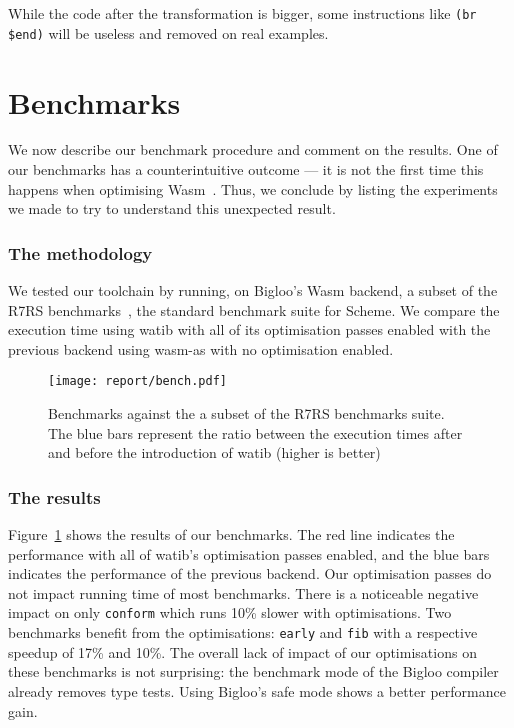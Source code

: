 \documentclass[a4paper,11pt]{article}
\begin{document}
While the code after the transformation is bigger, some instructions like
\texttt{(br \$end)} will be useless and removed on real examples.

\section{Benchmarks}\label{bench}
We now describe our benchmark procedure and comment on the results. One of our
benchmarks has a counterintuitive outcome --- it is not the first time this
happens when optimising Wasm~\cite{romano2023function}. Thus, we conclude by
listing the experiments we made to try to understand this unexpected result.
\subsubsection{The methodology}
We tested our toolchain by running, on Bigloo's Wasm backend, a subset of the
R7RS benchmarks~\cite{r7rsbench}, the standard benchmark suite for Scheme. We
compare the execution time using \textsf{watib} with all of its optimisation
passes enabled with the previous backend using \textsf{wasm-as} with no
optimisation enabled.
\begin{figure}[h!]
  \texttt{[image: report/bench.pdf]}
  \caption{Benchmarks against the a subset of the R7RS benchmarks suite. The
    blue bars represent the ratio between the execution times after and before
    the introduction of \textsf{watib} (higher is better)}\label{r7rs}
\end{figure}
\subsubsection{The results}
Figure~\ref{r7rs} shows the results of our benchmarks. The red line indicates
the performance with all of \textsf{watib}'s optimisation passes enabled,
and the blue bars indicates the performance of the previous backend. Our
optimisation passes do not impact running time of most benchmarks. There is a
noticeable negative impact on only \texttt{conform} which runs 10\% slower with
optimisations. Two benchmarks benefit from the optimisations: \texttt{early} and
\texttt{fib} with a respective speedup of 17\% and 10\%. The overall lack of
impact of our optimisations on these benchmarks is not surprising: the benchmark
mode of the Bigloo compiler already removes type tests. Using Bigloo's safe mode
shows a better performance gain.
\end{document}
